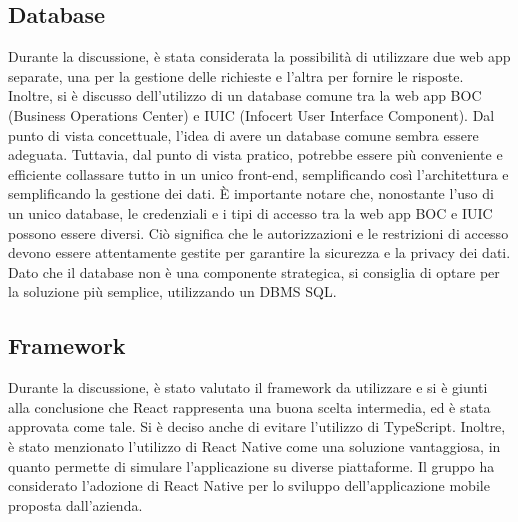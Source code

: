 \subsection{Database}
Durante la discussione, è stata considerata la possibilità di utilizzare due web app separate, una per la gestione delle richieste e l'altra per fornire 
le risposte. Inoltre, si è discusso dell'utilizzo di un database comune tra la web app BOC (Business Operations Center) e IUIC 
(Infocert User Interface Component). Dal punto di vista concettuale, l'idea di avere un database comune sembra essere adeguata. 
Tuttavia, dal punto di vista pratico, potrebbe essere più conveniente e efficiente collassare tutto in un unico front-end, semplificando così 
l'architettura e semplificando la gestione dei dati. È importante notare che, nonostante l'uso di un unico database, le credenziali e i tipi di accesso 
tra la web app BOC e IUIC possono essere diversi. Ciò significa che le autorizzazioni e le restrizioni di accesso devono essere attentamente gestite 
per garantire la sicurezza e la privacy dei dati. Dato che il database non è una componente strategica, si consiglia di optare per la soluzione più semplice, 
utilizzando un DBMS SQL.

\subsection{Framework}
Durante la discussione, è stato valutato il framework da utilizzare e si è giunti alla conclusione che React rappresenta una buona scelta intermedia, 
ed è stata approvata come tale. Si è deciso anche di evitare l'utilizzo di TypeScript. Inoltre, è stato menzionato l'utilizzo di React Native come 
una soluzione vantaggiosa, in quanto permette di simulare l'applicazione su diverse piattaforme.
Il gruppo ha considerato l'adozione di React Native per lo sviluppo dell'applicazione mobile proposta dall'azienda.

